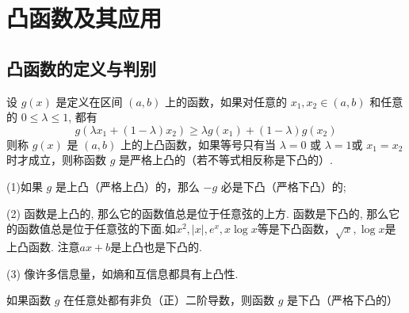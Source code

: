 
\section{凸函数及其应用}
\subsection{凸函数的定义与判别}
\begin{definition}
     设 $ g(x) $ 是定义在区间 $ (a, b) $ 上的函数，如果对任意的 $ x_{1}, x_{2} \in(a, b) $ 和任意的 $ 0 \leqslant \lambda \leqslant 1 $, 都有
$$
g\left(\lambda x_{1}+(1-\lambda) x_{2}\right) \geqslant \lambda g\left(x_{1}\right)+(1-\lambda) g\left(x_{2}\right)
$$
则称 $ g(x) $ 是 $ (a, b) $ 上的上凸函数，如果等号只有当 $ \lambda=0 $ 或 $ \lambda=1 $或 $ x_{1}=x_{2} $ 时才成立，则称函数 $ g $ 是严格上凸的（若不等式相反称是下凸的）.
\end{definition}
\begin{remark}

    (1)如果 $ g $ 是上凸（严格上凸）的，那么 $ -g $ 必是下凸（严格下凸）的;
    
(2) 函数是上凸的, 那么它的函数值总是位于任意弦的上方. 函数是下凸的, 那么它的函数值总是位于任意弦的下面.如$x^2,|x|,e^x,x\log x$等是下凸函数，$\sqrt{x}, \log x$是上凸函数. 注意$ax+b$是上凸也是下凸的.

(3) 像许多信息量，如熵和互信息都具有上凸性.
\end{remark}
\begin{theorem}[判定定理]
    如果函数 $ g $ 在任意处都有非负（正）二阶导数，则函数 $ g $ 是下凸（严格下凸的）
\end{theorem}
